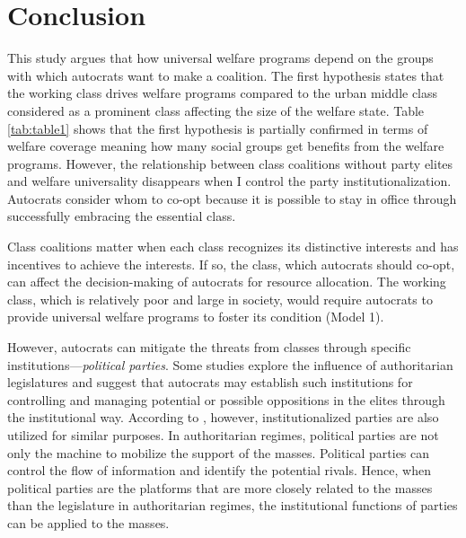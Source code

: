 \documentclass[11pt]{article}
\begin{document}




\section*{Conclusion}

This study argues that how universal welfare programs depend on the groups with which autocrats want to make a coalition. The first hypothesis states that the working class drives welfare programs compared to the urban middle class considered as a prominent class affecting the size of the welfare state. Table \ref{tab:table1} shows that the first hypothesis is partially confirmed in terms of welfare coverage meaning how many social groups get benefits from the welfare programs. However, the relationship between class coalitions without party elites and welfare universality disappears when I control the party institutionalization. Autocrats consider whom to co-opt because it is possible to stay in office through successfully embracing the essential class.

Class coalitions matter when each class recognizes its distinctive interests and has incentives to achieve the interests. If so, the class, which autocrats should co-opt, can affect the decision-making of autocrats for resource allocation. The working class, which is relatively poor and large in society, would require autocrats to provide universal welfare programs to foster its condition (Model 1). 

However, autocrats can mitigate the threats from classes through specific institutions---\textit{political parties}. Some studies explore the influence of authoritarian legislatures \citep{Jensen2014, Truex2012} and suggest that autocrats may establish such institutions for controlling and managing potential or possible oppositions in the elites through the institutional way. According to \citet{Magaloni2006}, however, institutionalized parties are also utilized for similar purposes. In authoritarian regimes, political parties are not only the machine to mobilize the support of the masses. Political parties can control the flow of information and identify the potential rivals. Hence, when political parties are the platforms that are more closely related to the masses than the legislature in authoritarian regimes, the institutional functions of parties can be applied to the masses.
\end{document}
